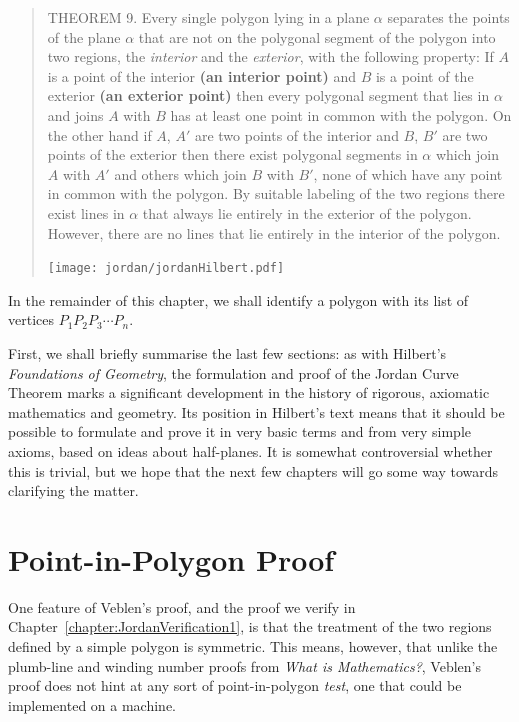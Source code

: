 \begin{quote}
  THEOREM 9. Every single polygon lying in a plane $\alpha$ separates the points of the plane $\alpha$ that are not on the polygonal segment of the polygon into two regions, the \emph{interior} and the \emph{exterior}, with the following property: If $A$ is a point of the interior {\bfseries (an interior point)} and $B$ is a point of the exterior {\bfseries (an exterior point)} then every polygonal segment that lies in $\alpha$ and joins $A$ with $B$ has at least one point in common with the polygon. On the other hand if $A$, $A'$ are two points of the interior and $B$, $B'$ are two points of the exterior then there exist polygonal segments in $\alpha$ which join $A$ with $A'$ and others which join $B$ with $B'$, none of which have any point in common with the polygon. By suitable labeling of the two regions there exist lines in $\alpha$ that always lie entirely in the exterior of the polygon. However, there are no lines that lie entirely in the interior of the polygon.

  \centering\texttt{[image: jordan/jordanHilbert.pdf]}
\end{quote}

In the remainder of this chapter, we shall identify a polygon with its list of vertices $P_1P_2P_3\cdots P_n$.

First, we shall briefly summarise the last few sections: as with Hilbert's \emph{Foundations of Geometry}, the formulation and proof of the Jordan Curve Theorem marks a significant development in the history of rigorous, axiomatic mathematics and geometry. Its position in Hilbert's text means that it should be possible to formulate and prove it in very basic terms and from very simple axioms, based on ideas about half-planes. It is somewhat controversial whether this is trivial, but we hope that the next few chapters will go some way towards clarifying the matter.

\section{Point-in-Polygon Proof}\label{sec:JordanCurveFirstProof}
One feature of Veblen's proof, and the proof we verify in Chapter~\ref{chapter:JordanVerification1}, is that the treatment of the two regions defined by a simple polygon is symmetric. This means, however, that unlike the plumb-line and winding number proofs from \emph{What is Mathematics?}, Veblen's proof does not hint at any sort of point-in-polygon \emph{test}, one that could be implemented on a machine.


